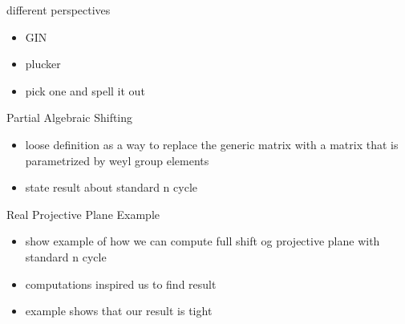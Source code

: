 \documentclass[9pt]{beamer}
\theoremstyle{definition}
\begin{document}

\begin{frame}[fragile]{different perspectives }
  \begin{itemize}
  \item GIN
  \item plucker
  \item pick one and spell it out
  \end{itemize}
\end{frame}


\begin{frame}[fragile]{Partial Algebraic Shifting }
  \begin{itemize}
  \item loose definition as a way to replace the generic matrix with a matrix that is parametrized by weyl group elements
  \item state result about standard n cycle
  \end{itemize}
\end{frame}


\begin{frame}[fragile]{Real Projective Plane Example}
  \begin{itemize}
  \item show example of how we can compute full shift og projective plane with standard n cycle
  \item computations inspired us to find result
  \item example shows that our result is tight
  \end{itemize}
\end{frame}


\end{document}
